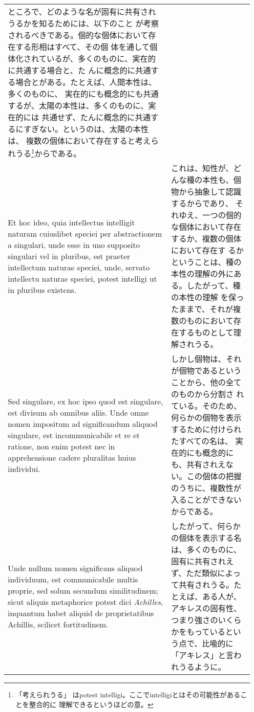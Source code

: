 \documentclass[paper=a4paper,fontsize=10pt,jafontsize=9pt,titlepage]{jlreq}
\begin{document}
\begin{longtable}{p{21em}p{21em}}
ところで、どのような名が固有に共有されうるかを知るためには、以下のこと
が考察されるべきである。個的な個体において存在する形相はすべて、その個
体を通して個体化されているが、多くのものに、実在的に共通する場合と、た
んに概念的に共通する場合とがある。たとえば、人間本性は、多くのものに、
実在的にも概念的にも共通するが、太陽の本性は、多くのものに、実在的には
共通せず、たんに概念的に共通するにすぎない。というのは、太陽の本性は、
複数の個体において存在すると考えられうる\footnote{「考えられうる」
はpotest intelligi。ここでintelligiとはその可能性があることを整合的に
理解できるというほどの意。}からである。

\\

Et hoc ideo, quia intellectus intelligit naturam cuiuslibet speciei
per abstractionem a singulari, unde esse in uno supposito singulari
vel in pluribus, est praeter intellectum naturae speciei, unde,
servato intellectu naturae speciei, potest intelligi ut in pluribus
existens.

&

これは、知性が、どんな種の本性も、個物から抽象して認識するからであり、
それゆえ、一つの個的な個体において存在するか、複数の個体において存在す
るかということは、種の本性の理解の外にある。したがって、種の本性の理解
を保ったままで、それが複数のものにおいて存在するものとして理解されうる。

\\

Sed singulare, ex hoc ipso quod est singulare, est divisum ab omnibus
aliis. Unde omne nomen impositum ad significandum aliquod singulare,
est incommunicabile et re et ratione, non enim potest nec in
apprehensione cadere pluralitas huius individui.

&

しかし個物は、それが個物であるということから、他の全てのものから分割さ
れている。そのため、何らかの個物を表示するために付けられたすべての名は、
実在的にも概念的にも、共有されえない。この個体の把握のうちに、複数性が
入ることができないからである。

\\

Unde nullum nomen significans aliquod individuum, est communicabile
multis proprie, sed solum secundum similitudinem; sicut aliquis
metaphorice potest dici {\itshape Achilles}, inquantum habet aliquid
de proprietatibus Achillis, scilicet fortitudinem.

&

したがって、何らかの個体を表示する名は、多くのものに、固有に共有されえ
ず、ただ類似によって共有されうる。たとえば、ある人が、アキレスの固有性、
つまり強さのいくらかをもっているという点で、比喩的に「アキレス」と言わ
れうるように。


\end{longtable}
\end{document}
